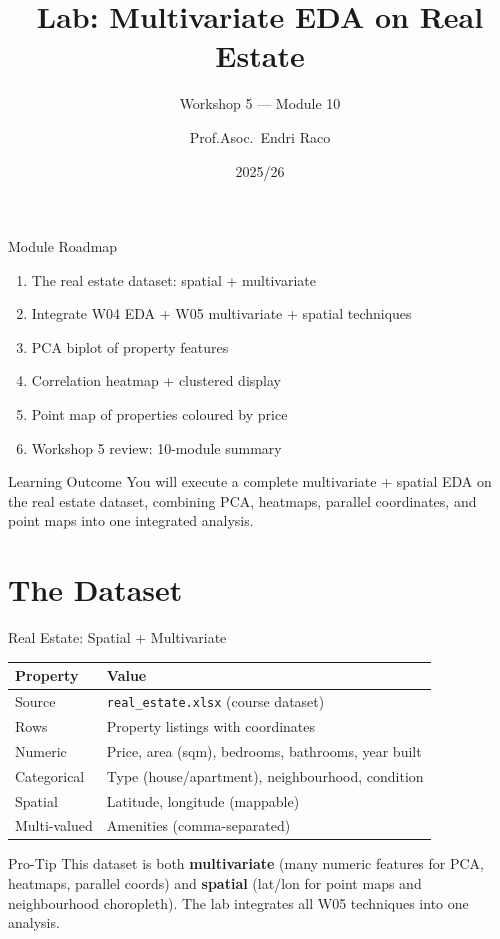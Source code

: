 \documentclass[10pt]{beamer}
\title{Lab: Multivariate EDA on Real Estate}
\subtitle{Workshop 5 --- Module 10}
\author{Prof.Asoc.\ Endri Raco}
\institute{Data Visualization for Data Scientists \\ UNYT Tirana}
\date{2025/26}
\begin{document}
\begin{frame}\titlepage\end{frame}
\begin{frame}{Module Roadmap}
\begin{enumerate}
\item The real estate dataset: spatial + multivariate
\item Integrate W04 EDA + W05 multivariate + spatial techniques
\item PCA biplot of property features
\item Correlation heatmap + clustered display
\item Point map of properties coloured by price
\item Workshop 5 review: 10-module summary
\end{enumerate}
\begin{exampleblock}{Learning Outcome}
You will execute a complete multivariate + spatial EDA on the real estate dataset, combining PCA, heatmaps, parallel coordinates, and point maps into one integrated analysis.
\end{exampleblock}
\end{frame}
\section{The Dataset}
\begin{frame}{Real Estate: Spatial + Multivariate}
\centering
\begin{tabular}{ll}
\toprule
\textbf{Property} & \textbf{Value} \\
\midrule
Source & \texttt{real\_estate.xlsx} (course dataset) \\
Rows & Property listings with coordinates \\
Numeric & Price, area (sqm), bedrooms, bathrooms, year built \\
Categorical & Type (house/apartment), neighbourhood, condition \\
Spatial & Latitude, longitude (mappable) \\
Multi-valued & Amenities (comma-separated) \\
\bottomrule
\end{tabular}
\vspace{6pt}
\begin{alertblock}{Pro-Tip}
This dataset is both \textbf{multivariate} (many numeric features for PCA, heatmaps, parallel coords) and \textbf{spatial} (lat/lon for point maps and neighbourhood choropleth). The lab integrates all W05 techniques into one analysis.
\end{alertblock}
\end{frame}
\end{document}

